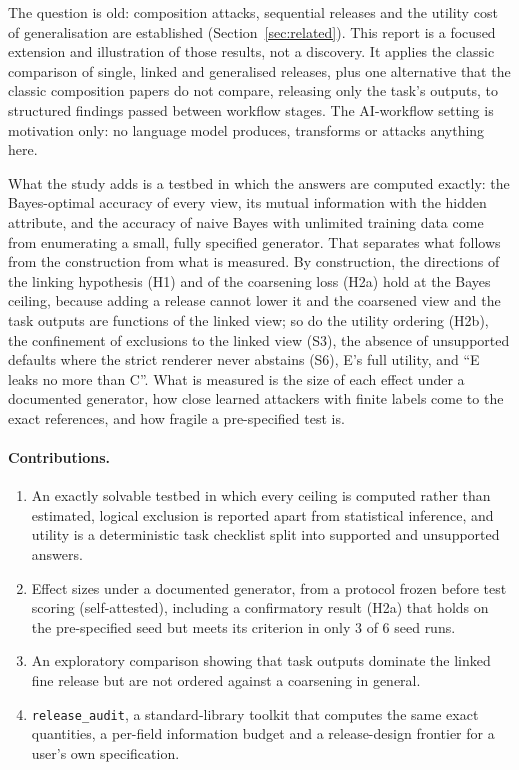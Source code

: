 \documentclass[11pt]{article}
\newcommand{\code}[1]{\texttt{#1}}
\begin{document}
The question is old: composition attacks, sequential releases and the utility cost of generalisation are established (Section~\ref{sec:related}). This report is a focused extension and illustration of those results, not a discovery. It applies the classic comparison of single, linked and generalised releases, plus one alternative that the classic composition papers do not compare, releasing only the task's outputs, to structured findings passed between workflow stages. The AI-workflow setting is motivation only: no language model produces, transforms or attacks anything here.

What the study adds is a testbed in which the answers are computed exactly: the Bayes-optimal accuracy of every view, its mutual information with the hidden attribute, and the accuracy of naive Bayes with unlimited training data come from enumerating a small, fully specified generator. That separates what follows from the construction from what is measured. By construction, the directions of the linking hypothesis (H1) and of the coarsening loss (H2a) hold at the Bayes ceiling, because adding a release cannot lower it and the coarsened view and the task outputs are functions of the linked view; so do the utility ordering (H2b), the confinement of exclusions to the linked view (S3), the absence of unsupported defaults where the strict renderer never abstains (S6), E's full utility, and ``E leaks no more than C''. What is measured is the size of each effect under a documented generator, how close learned attackers with finite labels come to the exact references, and how fragile a pre-specified test is.

\paragraph{Contributions.}
\begin{enumerate}
  \item An exactly solvable testbed in which every ceiling is computed rather than estimated, logical exclusion is reported apart from statistical inference, and utility is a deterministic task checklist split into supported and unsupported answers.
  \item Effect sizes under a documented generator, from a protocol frozen before test scoring (self-attested), including a confirmatory result (H2a) that holds on the pre-specified seed but meets its criterion in only 3 of 6 seed runs.
  \item An exploratory comparison showing that task outputs dominate the linked fine release but are not ordered against a coarsening in general.
  \item \code{release\_audit}, a standard-library toolkit that computes the same exact quantities, a per-field information budget and a release-design frontier for a user's own specification.
\end{enumerate}
\end{document}
